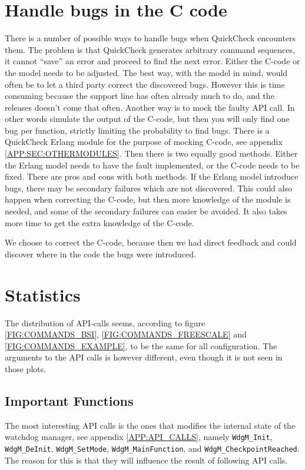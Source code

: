 \section{Handle bugs in the C code}
\label{sec:handlebugs}
There is a number of possible ways to handle bugs when QuickCheck
encounters them. The problem is that QuickCheck generates arbitrary
command sequences, it cannot ``save'' an error and proceed to find the
next error. Either the C-code or the model needs to be adjusted.  The
best way, with the model in mind, would often be to let a third party
correct the discovered bugs. However this is time consuming because
the support line has often already much to do, and the releases
doesn't come that often.  Another way is to mock the faulty API
call. In other words simulate the output of the C-code, but then you
will only find one bug per function, strictly limiting the probability
to find bugs. There is a QuickCheck Erlang module for the purpose of
mocking C-code, see appendix \ref{APP:SEC:OTHERMODULES}. Then there is
two equally good methods. Either the Erlang model needs to have the
fault implemented, or the C-code needs to be fixed. There are pros and
cons with both methods. If the Erlang model introduce bugs, there may
be secondary failures which are not discovered. This could also happen
when correcting the C-code, but then more knowledge of the module is
needed, and some of the secondary failures can easier be avoided. It
also takes more time to get the extra knowledge of the C-code.

We choose to correct the C-code, because then we had direct feedback
and could discover where in the code the bugs were introduced.

\section{Statistics}
The distribution of API-calls seems, according to figure
\ref{FIG:COMMANDS_BSI}, \ref{FIG:COMMANDS_FREESCALE} and
\ref{FIG:COMMANDS_EXAMPLE}, to be the same for all configuration. The
arguments to the API calls is however different, even though it is not
seen in those plots.

\subsection{Important Functions}
The most interesting API calls is the ones that
modifies the internal state of the watchdog manager, see appendix
\ref{APP:API_CALLS}, namely \lstinline!WdgM_Init!,
\lstinline!WdgM_DeInit!, \lstinline!WdgM_SetMode!,
\lstinline!WdgM_MainFunction!, and
\lstinline!WdgM_CheckpointReached!. The reason for this is that they
will influence the result of following API calls.

